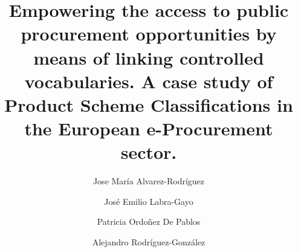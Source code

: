 \documentclass[preprint,12pt]{elsarticle}
\begin{document}
\begin{frontmatter}





\title{Empowering the access to public procurement opportunities by means of linking controlled vocabularies.  A case study of Product Scheme Classifications in the European e-Procurement sector.}


\author[label1]{Jose María Alvarez-Rodríguez}
\address[label1]{The South East European Research Center, Thessaloniki, Greece.}

\author[label2]{José Emilio Labra-Gayo}
\address[label2]{WESO Research Group, Department of Computer Science, University of Oviedo, 33007, Oviedo, Spain.}

\author[label3]{Patricia Ordoñez De Pablos}
\address[label3]{WESO Research Group, Department of Business Administration, University of Oviedo, 33007, Oviedo, Spain.}

\author[label4]{Alejandro Rodríguez-González}
\address[label4]{Bioinformatics at Centre for Plant Biotechnology and Genomics UPM-INIA, Polytechnic University of Madrid, Madrid, Spain.}



\author{}

\address{}


\end{frontmatter}
\end{document}
